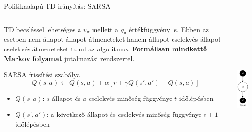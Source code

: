 \documentclass[english, aspectratio=169]{beamer}
\begin{document}
\begin{frame}{Politikaalapú TD irányítás: SARSA}
\begin{columns}
\begin{column}{.8\textwidth}
TD becsléssel lehetséges a $v_\pi$ mellett a $q_\pi$ értékfüggvény is. Ebben az esetben nem állapot-állapot átmeneteket hanem állapot-cselekvés állapot-cselekvés átmeneteket tanul az algoritmus. \textbf{Formálisan mindkettő Markov folyamat} jutalmazási rendszerrel. \par\smallskip
\begin{center}
\begin{block}{SARSA frissítési szabálya}
\[
Q(s,a) \leftarrow Q(s,a) + \alpha \left[ r + \gamma Q(s',a') - Q(s,a) \right]
\]
\vspace{-0.5cm}
\begin{itemize}
	\item $Q(s,a)$: $s$ állapot és $a$ cselekvés minőség függvénye $t$ időlépésben
	\item $Q(s',a')$: a következő állapot és cselekvés minőség függvénye $t+1$ időlépésben
\end{itemize}
\end{block}
\end{center}
\end{column}
\begin{column}{.2\textwidth}
\begin{center}
\includegraphics[height=7cm, keepaspectratio]{graphs/mc_td_5.png}
\end{center}
\end{column}
\end{columns}
\end{frame}
\end{document}
